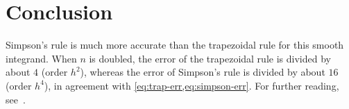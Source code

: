 \documentclass[11pt,a4paper]{article}
\begin{document}
\section{Conclusion}
Simpson's rule is much more accurate than the trapezoidal rule for this smooth integrand.
When $n$ is doubled, the error of the trapezoidal rule is divided by about $4$ (order $h^{2}$), whereas the error of Simpson's rule is divided by about $16$ (order $h^{4}$), in agreement with \cref{eq:trap-err,eq:simpson-err}.
For further reading, see~\cite{burden2016,atkinson1989,press2007}.

\printbibliography
\end{document}

